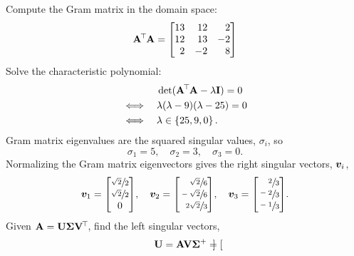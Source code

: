 \documentclass[11pt]{article}
\begin{document}
\begin{enumerate}
          Compute the Gram matrix in the domain space:
          \[
              \mat{A}^{\T} \mat{A} =
              \begin{bmatrix*}[r]
                  13 & 12 & 2 \\
                  12 & 13 & -2 \\
                  2 & -2 & 8 \\
              \end{bmatrix*}
          \]
          Solve the characteristic polynomial:
          \[
              \begin{aligned}
                             & \det(\mathbf{A}^{\mkern-2.5mu\top\mkern-2mu} \mathbf{A} - \lambda \mathbf{I}) = 0 \\
                  \iff \quad & \lambda (\lambda - 9)(\lambda - 25) = 0          \\
                  \iff \quad & \lambda \in \left\{25, 9, 0\right\}.
              \end{aligned}
          \]
          Gram matrix eigenvalues are the squared singular values, $\sigma_i$, so
          \[
              \sigma_1 = 5,
              \quad
              \sigma_2 = 3,
              \quad
              \sigma_3 = 0.
          \]
          Normalizing the Gram matrix eigenvectors gives the right singular vectors, $\bm{v}_i$,
          \[
              \vect{v}_1 =
              \begin{bmatrix}
                  \sfrac{\sqrt{2}}{2} \\ \sfrac{\sqrt{2}}{2} \\ 0
              \end{bmatrix} \! ,
              \quad
              \vect{v}_2 =
              \begin{bmatrix*}[r]
                  \sfrac{\sqrt{2}}{6} \\ \sfrac{-\sqrt{2}}{6} \\ \sfrac{2\sqrt{2}}{3}
              \end{bmatrix*} \! ,
              \quad
              \vect{v}_3 =
              \begin{bmatrix*}[r]
                  \sfrac{2}{3} \\ \sfrac{-2}{3} \\ \sfrac{-1}{3}
              \end{bmatrix*} \! .
          \]
          Given $\mathbf{A} = \mathbf{U} \mathbf{\Sigma} \mathbf{V}^{\mkern-2.5mu\top\mkern-2mu}$, find the left singular vectors,
          \[
              \mat{U} = \mat{A} \mat{V} \mat{\Sigma}^+ =
              \begin{bmatrix*}[r]

\end{bmatrix*}\]
\end{enumerate}
\end{document}

